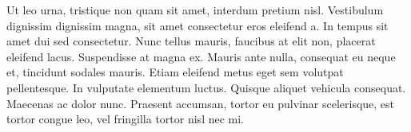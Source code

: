 \documentclass[12pt, a4paper]{article}
\begin{document}
Ut leo urna, tristique non quam sit amet, interdum pretium nisl. Vestibulum dignissim dignissim magna, sit amet consectetur eros eleifend a. In tempus sit amet dui sed consectetur. Nunc tellus mauris, faucibus at elit non, placerat eleifend lacus. Suspendisse at magna ex. Mauris ante nulla, consequat eu neque et, tincidunt sodales mauris. Etiam eleifend metus eget sem volutpat pellentesque. In vulputate elementum luctus. Quisque aliquet vehicula consequat. Maecenas ac dolor nunc. Praesent accumsan, tortor eu pulvinar scelerisque, est tortor congue leo, vel fringilla tortor nisl nec mi. 
\end{document}
